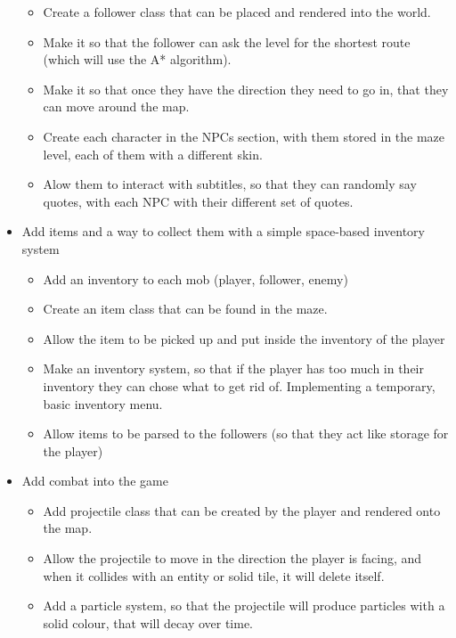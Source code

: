 \documentclass{article}
\begin{document}
\begin{itemize}
\begin{itemize}
                        \item Create a follower class that can be placed and rendered into the world.
                        \item Make it so that the follower can ask the level for the shortest route (which will use the A* algorithm).
                        \item Make it so that once they have the direction they need to go in, that they can move around the map.
                        \item Create each character in the NPCs section, with them stored in the maze level, each of them with a different skin.
                        \item Alow them to interact with subtitles, so that they can randomly say quotes, with each NPC with their different set of quotes.
                    \end{itemize}
                \item Add items and a way to collect them with a simple space-based inventory system
                    \begin{itemize}
                        \item Add an inventory to each mob (player, follower, enemy)
                        \item Create an item class that can be found in the maze.
                        \item Allow the item to be picked up and put inside the inventory of the player
                        \item Make an inventory system, so that if the player has too much in their inventory they can chose what to get rid of. Implementing a temporary, basic inventory menu.
                        \item Allow items to be parsed to the followers (so that they act like storage for the player)
                    \end{itemize}
                \item Add combat into the game
                    \begin{itemize}
                        \item Add projectile class that can be created by the player and rendered onto the map.
                        \item Allow the projectile to move in the direction the player is facing, and when it collides with an entity or solid tile, it will delete itself.
                        \item Add a particle system, so that the projectile will produce particles with a solid colour, that will decay over time.

\end{itemize}
\end{itemize}
\end{document}
